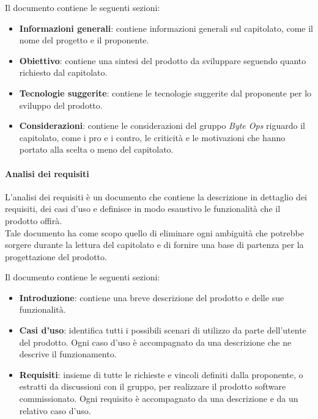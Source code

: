 Il documento contiene le seguenti sezioni:
\begin{itemize}
    \item \textbf{Informazioni generali}: contiene informazioni generali sul capitolato, come il nome del progetto e il proponente.
    \item \textbf{Obiettivo}: contiene una sintesi del prodotto da sviluppare seguendo quanto richiesto dal capitolato.
    \item \textbf{Tecnologie suggerite}: contiene le tecnologie suggerite dal proponente per lo sviluppo del prodotto.
    \item \textbf{Considerazioni}: contiene le considerazioni del gruppo \textit{Byte Ops} riguardo il capitolato, come i pro e i contro, le criticità e le motivazioni che hanno portato alla scelta o meno del capitolato.
\end{itemize}

\paragraph{Analisi dei requisiti}
L'analisi dei requisiti è un documento che contiene la descrizione in dettaglio dei requisiti, dei casi d'uso e definisce in modo esaustivo le funzionalità che il prodotto offirà.\\
Tale documento ha come scopo quello di eliminare ogni ambiguità che potrebbe sorgere durante la lettura del capitolato e di fornire una base di partenza per la progettazione del prodotto.

Il documento contiene le seguenti sezioni:
\begin{itemize}
    \item \textbf{Introduzione}: contiene una breve descrizione del prodotto e delle sue funzionalità.
    \item \textbf{Casi d'uso}: identifica tutti i possibili scenari di utilizzo da parte dell'utente del prodotto. Ogni caso d'uso è accompagnato da una descrizione che ne descrive il funzionamento.
    \item \textbf{Requisiti}: insieme di tutte le richieste e vincoli definiti dalla proponente, o estratti da discussioni con il gruppo, per realizzare il prodotto software commissionato. Ogni requisito è accompagnato da una descrizione e da un relativo caso d'uso.
\end{itemize}

